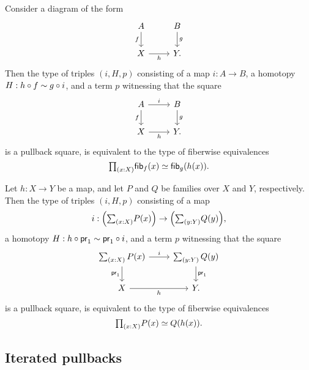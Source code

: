 \begin{thm}\label{thm:pb_fibequiv_complete}
Consider a diagram of the form
\begin{equation*}
\begin{tikzcd}
A \arrow[d,swap,"f"] & B \arrow[d,"g"] \\
X \arrow[r,swap,"h"] & Y.
\end{tikzcd}
\end{equation*}
Then the type of triples $(i,H,p)$ consisting of a map $i:A\to B$, a homotopy $H:h\circ f\sim g\circ i$, and a term $p$ witnessing that the square
\begin{equation*}
\begin{tikzcd}
A \arrow[d,swap,"f"] \arrow[r,"i"] & B \arrow[d,"g"] \\
X \arrow[r,swap,"h"] & Y.
\end{tikzcd}
\end{equation*}
is a pullback square, is equivalent to the type of fiberwise equivalences
\begin{equation*}
\prd{x:X}\eqv{\fib{f}{x}}{\fib{g}{h(x)}}.
\end{equation*}
\end{thm}

\begin{cor}\label{cor:pb_fibequiv_complete}
Let $h:X\to Y$ be a map, and let $P$ and $Q$ be families over $X$ and $Y$, respectively.
Then the type of triples $(i,H,p)$ consisting of a map 
\begin{equation*}
i:\Big(\sm{x:X}P(x)\Big)\to \Big(\sm{y:Y}Q(y)\Big),
\end{equation*}
a homotopy $H:h\circ \mathsf{pr}_{1}\sim \mathsf{pr}_{1}\circ i$, and a term $p$ witnessing that the square
\begin{equation*}
\begin{tikzcd}
\sm{x:X}P(x) \arrow[d,swap,"\proj 1"] \arrow[r,"i"] & \sm{y:Y}Q(y) \arrow[d,"\proj 1"] \\
X \arrow[r,swap,"h"] & Y.
\end{tikzcd}
\end{equation*}
is a pullback square, is equivalent to the type of fiberwise equivalences
\begin{equation*}
\prd{x:X}\eqv{P(x)}{Q(h(x))}.
\end{equation*}
\end{cor}

\subsection{Iterated pullbacks}

